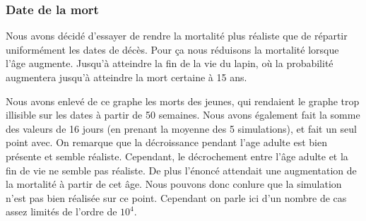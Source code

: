 \documentclass[11)pt,a4paper]{article}
\begin{document}
        \subsubsection{Date de la mort}
            Nous avons décidé d'essayer de rendre la mortalité plus réaliste que de répartir uniformément les dates de décès. Pour ça nous réduisons la mortalité lorsque l'âge augmente.
            Jusqu'à atteindre la fin de la vie du lapin, où la probabilité augmentera jusqu'à atteindre la mort certaine à 15 ans.
            \begin{center}
            \end{center}
            Nous avons enlevé de ce graphe les morts des jeunes, qui rendaient le graphe trop illisible sur les dates à partir de 50 semaines.
            Nous avons également fait la somme des valeurs de 16 jours (en prenant la moyenne des 5 simulations), et fait un seul point avec.
            On remarque que la décroissance pendant l'age adulte est bien présente et semble réaliste. Cependant, le décrochement entre l'âge adulte et la fin de vie ne semble pas réaliste. 
            De plus l'énoncé attendait une augmentation de la mortalité à partir de cet âge. Nous pouvons donc conlure que la simulation n'est pas bien réalisée sur ce point. Cependant on parle ici d'un nombre de cas assez limités de l'ordre de $10^4$.
\end{document}
